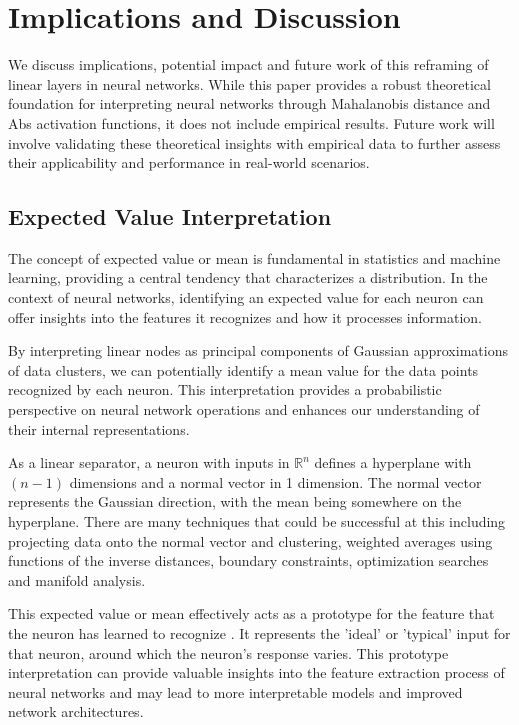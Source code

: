 
\section{Implications and Discussion}
\label{sec:discussion}

We discuss implications, potential impact and future work of this reframing of linear layers in neural networks. While this paper provides a robust theoretical foundation for interpreting neural networks through Mahalanobis distance and Abs activation functions, it does not include empirical results. Future work will involve validating these theoretical insights with empirical data to further assess their applicability and performance in real-world scenarios.

\subsection{Expected Value Interpretation}

The concept of expected value or mean is fundamental in statistics and machine learning, providing a central tendency that characterizes a distribution. In the context of neural networks, identifying an expected value for each neuron can offer insights into the features it recognizes and how it processes information.

By interpreting linear nodes as principal components of Gaussian approximations of data clusters, we can potentially identify a mean value for the data points recognized by each neuron. This interpretation provides a probabilistic perspective on neural network operations and enhances our understanding of their internal representations.

As a linear separator, a neuron with inputs in $\mathbb{R}^n$ defines a hyperplane with $(n-1)$ dimensions and a normal vector in 1 dimension. The normal vector represents the Gaussian direction, with the mean being somewhere on the hyperplane. There are many techniques that could be successful at this including projecting data onto the normal vector and clustering, weighted averages using functions of the inverse distances, boundary constraints, optimization searches and manifold analysis.

This expected value or mean effectively acts as a prototype for the feature that the neuron has learned to recognize \citep{li2018deep}. It represents the 'ideal' or 'typical' input for that neuron, around which the neuron's response varies. This prototype interpretation can provide valuable insights into the feature extraction process of neural networks and may lead to more interpretable models and improved network architectures.

